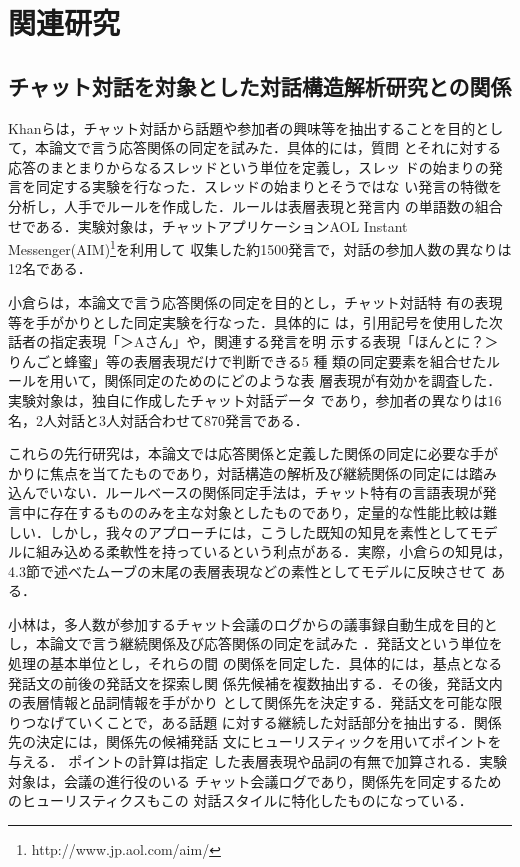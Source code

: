 \section{関連研究}

\subsection{チャット対話を対象とした対話構造解析研究との関係}
Khanらは，チャット対話から話題や参加者の興味等を抽出することを目的とし
て，本論文で言う応答関係の同定を試みた\cite{Khan:02}．具体的には，質問
とそれに対する応答のまとまりからなるスレッドという単位を定義し，スレッ
ドの始まりの発言を同定する実験を行なった．スレッドの始まりとそうではな
い発言の特徴を分析し，人手でルールを作成した．ルールは表層表現と発言内
の単語数の組合せである．実験対象は，チャットアプリケーションAOL
Instant Messenger(AIM)\footnote{http://www.jp.aol.com/aim/}を利用して
収集した約1500発言で，対話の参加人数の異なりは12名である．

小倉らは，本論文で言う応答関係の同定を目的とし，チャット対話特
有の表現等を手がかりとした同定実験を行なった\cite{Ogura:03}．具体的に
は，引用記号を使用した次話者の指定表現「＞Aさん」や，関連する発言を明
示する表現「ほんとに？＞りんごと蜂蜜」等の表層表現だけで判断できる5 種
類の同定要素を組合せたルールを用いて，関係同定のためのにどのような表
層表現が有効かを調査した．実験対象は，独自に作成したチャット対話データ
であり，参加者の異なりは16名，2人対話と3人対話合わせて870発言である．

これらの先行研究は，本論文では応答関係と定義した関係の同定に必要な手が
かりに焦点を当てたものであり，対話構造の解析及び継続関係の同定には踏み
込んでいない．ルールベースの関係同定手法は，チャット特有の言語表現が発
言中に存在するもののみを主な対象としたものであり，定量的な性能比較は難
しい．しかし，我々のアプローチには，こうした既知の知見を素性としてモデ
ルに組み込める柔軟性を持っているという利点がある．実際，小倉らの知見は，
4.3節で述べたムーブの末尾の表層表現などの素性としてモデルに反映させて
ある．

小林は，多人数が参加するチャット会議のログからの議事録自動生成を目的と
し，本論文で言う継続関係及び応答関係の同定を試みた
\cite{Kobayashi:03}．発話文という単位を処理の基本単位とし，それらの間
の関係を同定した．具体的には，基点となる発話文の前後の発話文を探索し関
係先候補を複数抽出する．その後，発話文内の表層情報と品詞情報を手がかり
として関係先を決定する．発話文を可能な限りつなげていくことで，ある話題
に対する継続した対話部分を抽出する．関係先の決定には，関係先の候補発話
文にヒューリスティックを用いてポイントを与える． ポイントの計算は指定
した表層表現や品詞の有無で加算される．実験対象は，会議の進行役のいる
チャット会議ログであり，関係先を同定するためのヒューリスティクスもこの
対話スタイルに特化したものになっている．

